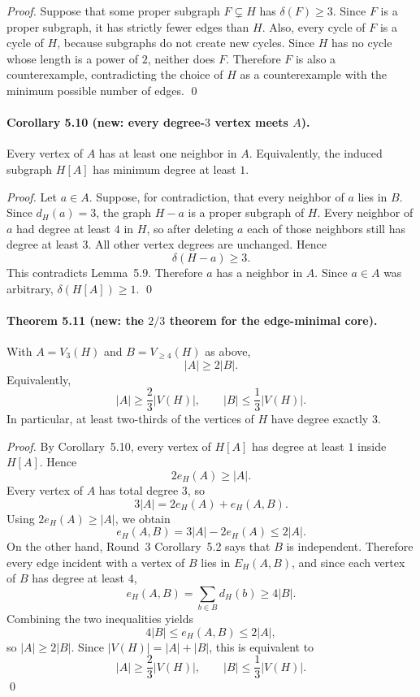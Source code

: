\emph{Proof.}
Suppose that some proper subgraph $F\subsetneq H$ has $\delta(F)\ge 3$. Since $F$ is a proper subgraph, it has strictly fewer edges than $H$. Also, every cycle of $F$ is a cycle of $H$, because subgraphs do not create new cycles. Since $H$ has no cycle whose length is a power of $2$, neither does $F$. Therefore $F$ is also a counterexample, contradicting the choice of $H$ as a counterexample with the minimum possible number of edges. \qed

\paragraph{Corollary 5.10 (new: every degree-$3$ vertex meets $A$).}
Every vertex of $A$ has at least one neighbor in $A$. Equivalently, the induced subgraph $H[A]$ has minimum degree at least $1$.

\emph{Proof.}
Let $a\in A$. Suppose, for contradiction, that every neighbor of $a$ lies in $B$. Since $d_H(a)=3$, the graph $H-a$ is a proper subgraph of $H$. Every neighbor of $a$ had degree at least $4$ in $H$, so after deleting $a$ each of those neighbors still has degree at least $3$. All other vertex degrees are unchanged. Hence
\[
  \delta(H-a)\ge 3.
\]
This contradicts Lemma~5.9. Therefore $a$ has a neighbor in $A$. Since $a\in A$ was arbitrary, $\delta(H[A])\ge 1$. \qed

\paragraph{Theorem 5.11 (new: the $2/3$ theorem for the edge-minimal core).}
With $A=V_3(H)$ and $B=V_{\ge 4}(H)$ as above,
\[
  |A|\ge 2|B|.
\]
Equivalently,
\[
  |A|\ge \frac{2}{3}|V(H)|,
  \qquad
  |B|\le \frac{1}{3}|V(H)|.
\]
In particular, at least two-thirds of the vertices of $H$ have degree exactly $3$.

\emph{Proof.}
By Corollary~5.10, every vertex of $H[A]$ has degree at least $1$ inside $H[A]$. Hence
\[
  2e_H(A)\ge |A|.
\]
Every vertex of $A$ has total degree $3$, so
\[
  3|A| = 2e_H(A)+e_H(A,B).
\]
Using $2e_H(A)\ge |A|$, we obtain
\[
  e_H(A,B) = 3|A|-2e_H(A) \le 2|A|.
\]
On the other hand, Round~3 Corollary~5.2 says that $B$ is independent. Therefore every edge incident with a vertex of $B$ lies in $E_H(A,B)$, and since each vertex of $B$ has degree at least $4$,
\[
  e_H(A,B)=\sum_{b\in B} d_H(b)\ge 4|B|.
\]
Combining the two inequalities yields
\[
  4|B|\le e_H(A,B)\le 2|A|,
\]
so $|A|\ge 2|B|$. Since $|V(H)|=|A|+|B|$, this is equivalent to
\[
  |A|\ge \frac{2}{3}|V(H)|,
  \qquad
  |B|\le \frac{1}{3}|V(H)|.
\]
\qed

